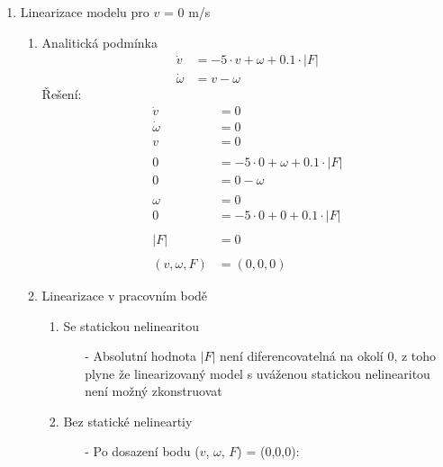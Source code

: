 \documentclass{article}
\begin{document}
\begin{enumerate}
    \newpage
    \item Linearizace modelu pro $v$ = 0 m/s
        \begin{enumerate}
            \item Analitická podmínka
                \label{1.3.a}
                \begin{align*}
                    \dot{v} &= -5 \cdot v + \omega + 0.1 \cdot |F|\\
                    \dot{\omega} &= v - \omega
                \end{align*}
                Řešení:
                \begin{align*}
                    \dot{v} &= 0\\
                    \dot{\omega} &= 0\\
                    v &= 0\\ 
                    \\
                    0 &= -5 \cdot 0 + \omega + 0.1 \cdot |F|\\
                    0 &= 0 - \omega\\
                    \\
                    \omega &= 0\\
                    0 &= -5 \cdot 0 + 0 + 0.1 \cdot |F|\\
                    \\
                    |F| &= 0\\
                    \\
                    (v,\omega,F) &= (0,0,0)
                \end{align*}
            \item Linearizace v pracovním bodě
                \begin{enumerate}
                    \item Se statickou nelinearitou
                        \label{1.3.b.I}
                        \begin{itemize}
                            \item[-] Absolutní hodnota $\left |F \right |$ není diferencovatelná na okolí 0, z toho plyne že linearizovaný model s uváženou statickou nelinearitou není možný zkonstruovat
                        \end{itemize}
                        
                    \newpage
                    \item Bez statické nelineartiy
                        \label{1.3.b.II}
                        \begin{itemize}
                            \item[-] Po dosazení bodu ($v$, $\omega$, $F$) = (0,0,0):
                        \end{itemize}


\end{enumerate}
\end{enumerate}
\end{enumerate}
\end{document}
